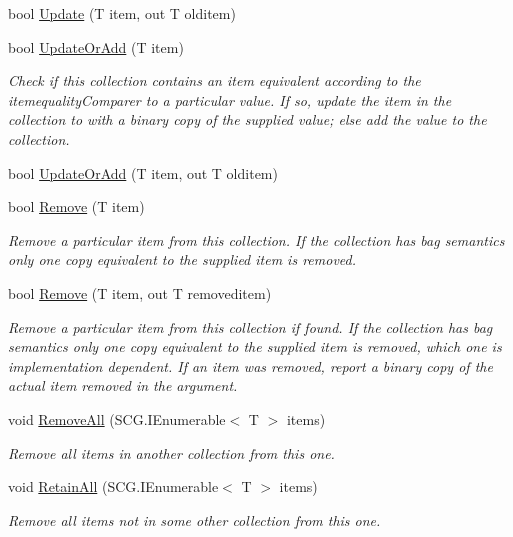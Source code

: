 \begin{DoxyCompactItemize}
bool \hyperlink{class_c5_1_1_sorted_array_a164df9a0ba5cc59a5ff1bc923dc096fa}{Update} (T item, out T olditem)
\item 
bool \hyperlink{class_c5_1_1_sorted_array_a2be0a362b17608ea4443a667a5e58c25}{Update\+Or\+Add} (T item)
\begin{DoxyCompactList}\small\item\em Check if this collection contains an item equivalent according to the itemequality\+Comparer to a particular value. If so, update the item in the collection to with a binary copy of the supplied value; else add the value to the collection. \end{DoxyCompactList}\item 
bool \hyperlink{class_c5_1_1_sorted_array_afdd7b8a6e4fe02a1d91e5085d48ce7f8}{Update\+Or\+Add} (T item, out T olditem)
\item 
bool \hyperlink{class_c5_1_1_sorted_array_a4bd50348d1eaf888c4c66b46dcf52d04}{Remove} (T item)
\begin{DoxyCompactList}\small\item\em Remove a particular item from this collection. If the collection has bag semantics only one copy equivalent to the supplied item is removed. \end{DoxyCompactList}\item 
bool \hyperlink{class_c5_1_1_sorted_array_a02f963bfc980a73d45ff434fa4d8eae7}{Remove} (T item, out T removeditem)
\begin{DoxyCompactList}\small\item\em Remove a particular item from this collection if found. If the collection has bag semantics only one copy equivalent to the supplied item is removed, which one is implementation dependent. If an item was removed, report a binary copy of the actual item removed in the argument. \end{DoxyCompactList}\item 
void \hyperlink{class_c5_1_1_sorted_array_aedd7008a07388c8ad0463f52e3f2562c}{Remove\+All} (S\+C\+G.\+I\+Enumerable$<$ T $>$ items)
\begin{DoxyCompactList}\small\item\em Remove all items in another collection from this one. \end{DoxyCompactList}\item 
void \hyperlink{class_c5_1_1_sorted_array_abb280e148baa50e5793aa4368ce33876}{Retain\+All} (S\+C\+G.\+I\+Enumerable$<$ T $>$ items)
\begin{DoxyCompactList}\small\item\em Remove all items not in some other collection from this one. \end{DoxyCompactList}\item 

\end{DoxyCompactItemize}
